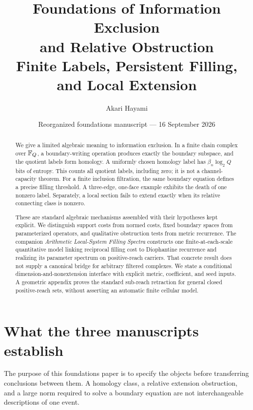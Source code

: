 \documentclass[11pt,a4paper]{article}
\title{\textbf{Foundations of Information Exclusion}\\
\textbf{and Relative Obstruction}\\
\large Finite Labels, Persistent Filling, and Local Extension}
\author{Akari Hayami}
\date{Reorganized foundations manuscript --- 16 September 2026}
\begin{document}
\maketitle

\begin{abstract}
We give a limited algebraic meaning to information exclusion.  In a finite
chain complex over $\mathbb F_Q$, a boundary-writing operation produces exactly
the boundary subspace, and the quotient labels form homology.  A uniformly
chosen homology label has $\beta_n\log_2 Q$ bits of entropy.  This counts
all quotient labels, including zero; it is not a channel-capacity theorem.
For a finite inclusion filtration, the same boundary equation defines a
precise filling threshold.  A three-edge, one-face example exhibits the
death of one nonzero label.  Separately, a local section fails to extend
exactly when its relative connecting class is nonzero.

These are standard algebraic mechanisms assembled with their hypotheses
kept explicit.  We distinguish support costs from normed costs, fixed
boundary spaces from parameterized operators, and qualitative obstruction
tests from metric recurrence.  The companion \emph{Arithmetic Local-System
Filling Spectra} constructs one finite-at-each-scale quantitative model
linking reciprocal filling cost to Diophantine recurrence and realizing
its parameter spectrum on positive-reach carriers.  That concrete result
does not supply a canonical bridge for arbitrary filtered complexes.
We state a conditional dimension-and-nonextension interface with explicit
metric, coefficient, and seed inputs.  A geometric appendix proves the
standard sub-reach retraction for general closed positive-reach sets,
without asserting an automatic finite cellular model.
\end{abstract}

\tableofcontents
\clearpage

\section{What the three manuscripts establish}
\label{sec:scope}

The purpose of this foundations paper is to specify the objects before
transferring conclusions between them.  A homology class, a relative
extension obstruction, and a large norm required to solve a boundary
equation are not interchangeable descriptions of one event.
\end{document}
